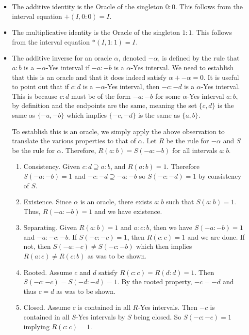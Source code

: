 \documentclass[12pt]{article}
\theoremstyle{remark}
\begin{document}
\begin{itemize}
    \item The additive identity is the Oracle of the singleton $0:0$. This follows from the interval equation $+(I, 0:0) = I$.
    \item The multiplicative identity is the Oracle of the singleton $1:1$. This follows from the interval equation $*(I, 1:1) = I$.
    \item The additive inverse for an oracle $\alpha$, denoted $-\alpha$, is defined by the rule that $a:b$ is a $-\alpha$-Yes interval if $-a:-b$ is a $\alpha$-Yes interval. We need to establish that this is an oracle and that it does indeed satisfy $\alpha + -\alpha = 0$. 
    It is useful to point out that if $c:d$ is a $-\alpha$-Yes interval, then $-c:-d$ is a $\alpha$-Yes interval. This is because $c:d$ must be of the form $-a:-b$ for some $\alpha$-Yes interval $a:b$, by definition and the endpoints are the same, meaning the set $\{c,d\}$ is the same as $\{-a, -b\}$ which implies $\{-c, -d\}$ is the same as $\{a, b\}$.
    
    To establish this is an oracle, we simply apply the above observation to translate the various properties to that of $\alpha$. Let $R$ be the rule for $-\alpha$ and $S$ be the rule for $\alpha$. Therefore, $R(a:b)=S(-a:-b)$ for all intervals $a:b$.
    
    \begin{enumerate}
        \item Consistency. Given $c:d \supseteq a:b$, and $R(a:b)=1$. Therefore $S(-a:-b) = 1$ and $-c:-d \supseteq -a:-b$ so $S(-c:-d)=1$ by consistency of $S$. 
        \item Existence. Since $\alpha$ is an oracle, there exists $a:b$ such that $S(a:b)=1$. Thus, $R(-a:-b)=1$ and we have existence. 
        \item Separating. Given $R(a:b)=1$ and $a:c:b$, then we have $S(-a:-b)=1$ and $-a:-c:-b$. If $S(-c:-c)=1$, then $R(c:c)=1$ and we are done. If not, then $S(-a:-c) \neq S(-c:-b)$ which then implies $R(a:c)\neq R(c:b)$ as was to be shown. 
        \item Rooted. Assume $c$ and $d$ satisfy $R(c:c)=R(d:d)=1$. Then $S(-c:-c)=S(-d:-d)=1$. By the rooted property, $-c = -d$ and thus $c=d$ as was to be shown. 
        \item Closed. Assume $c$ is contained in all $R$-Yes intervals. Then $-c$ is contained in all $S$-Yes intervals by $S$ being closed. So $S(-c:-c)=1$ implying $R(c:c)=1$.
    \end{enumerate}
    

\end{itemize}
\end{document}
